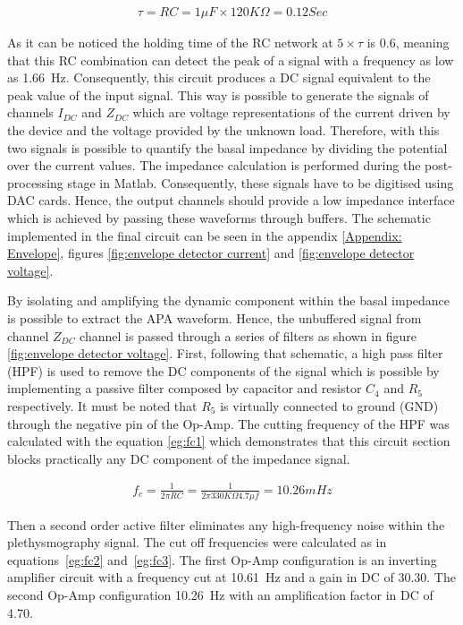 \begin{align}
\tau = RC = 1 \mu F \times 120K\Omega = 0.12 Sec
\end{align}

As it can be noticed the holding time of the RC network at $5\times\tau$ is \SI{0.6}{\sec}, meaning that this RC combination can detect the peak of a signal with a frequency as low as \SI{1.66}{\Hz}. Consequently, this circuit produces a DC signal equivalent to the peak value of the input signal. This way is possible to generate the signals of channels $I_{DC}$ and $Z_{DC}$ which are voltage representations of the current driven by the device and the voltage provided by the unknown load. Therefore, with this two signals is possible to quantify the basal impedance by dividing the potential over the current values. The impedance calculation is performed during the post-processing stage in Matlab. Consequently, these signals have to be digitised using DAC cards. Hence, the output channels should provide a low impedance interface which is achieved by passing these waveforms through buffers. The schematic implemented in the final circuit can be seen in the appendix \ref{Appendix: Envelope}, figures \ref{fig:envelope detector current} and \ref{fig:envelope detector voltage}.

By isolating and amplifying the dynamic component within the basal impedance is possible to extract the APA waveform. Hence, the unbuffered signal from channel $Z_{DC}$ channel is passed through a series of filters as shown in figure \ref{fig:envelope detector voltage}. First, following that schematic, a high pass filter (HPF) is used to remove the DC components of the signal which is possible by implementing a passive filter composed by capacitor and resistor  $C_4$ and $R_5$ respectively. It must be noted that $R_5$ is virtually connected to ground (GND) through the negative pin of the Op-Amp. The cutting frequency of the HPF was calculated with the equation \ref{eg:fc1} which demonstrates that this circuit section blocks practically any DC component of the impedance signal. 

\begin{align}
\label{eg:fc1}
f_c = \frac{1}{2 \pi R C} = \frac{1}{2 \pi 330K\Omega 4.7\mu f}=10.26 mHz
\end{align}

Then a second order active filter eliminates any high-frequency noise within the plethysmography signal. The cut off frequencies were calculated as in equations~\ref{eg:fc2} and~\ref{eg:fc3}. The first Op-Amp configuration is an inverting amplifier circuit with a frequency cut at \SI{10.61}{\Hz} and a gain in DC of \num{30.30}. The second Op-Amp configuration \SI{10.26}{\Hz} with an amplification factor in DC of \num{4.70}. 


